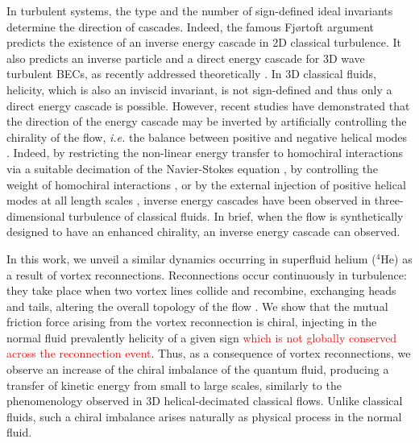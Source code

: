 \documentclass[%
 reprint,
 amsmath,amssymb,
 aps,
 prl,
]{revtex4-2}
\def\red#1{\textcolor{red}{#1}}
\begin{document}
{In turbulent systems, the type and the number of sign-defined ideal invariants determine the direction of cascades. Indeed, the famous 
Fjørtoft argument \cite{fjortoft1953changes} predicts 
the existence of an inverse energy cascade
in 2D classical turbulence. 
It also predicts an inverse particle and a direct energy cascade 
for 3D wave turbulent BECs, as recently addressed theoretically \cite{Zhu_DirectInverseCascades_2023}. In 3D classical fluids, helicity, which is also an inviscid invariant, is not sign-defined and thus only a direct energy cascade is possible. However, recent studies have demonstrated that the direction of the energy 
cascade may be inverted by artificially controlling the chirality of the 
flow, \textit{i.e.} the balance between positive and negative helical 
modes \cite{moffatt1969}.
Indeed, by restricting the non-linear energy transfer to homochiral 
interactions via a suitable decimation of the Navier-Stokes equation 
\cite{biferaleInverseEnergyCascade2012a,biferale-etal-2013}, by
controlling the weight of homochiral interactions \cite{sahoo-etal-2017},
or by the external injection 
of positive helical modes at all length scales 
\cite{plunianInverseCascadeEnergy2020a}, inverse energy cascades 
have been observed in three-dimensional turbulence of classical fluids. 
In brief, when the flow is synthetically designed to have an 
enhanced chirality, an inverse energy cascade can observed.


In this work, we unveil a similar dynamics occurring in superfluid helium
($^4$He) as a result of vortex reconnections.  
Reconnections occur continuously in turbulence: they take place when
two vortex lines collide and recombine, exchanging heads and tails, 
altering the overall topology of the flow
\cite{koplik-levine-1993,bewley-etal-2008,rorai-etal-2016,serafini-etal-2017,galantucci-baggaley-parker-barenghi-2019,villoisUniversalNonuniversalAspects2017,villois2020irreversible}. 
We show that the mutual friction force arising from the  
vortex reconnection is chiral, injecting in the normal fluid prevalently 
helicity of a given sign \red{which is not globally conserved across the reconnection event}. Thus, as a consequence of vortex reconnections,
we observe an increase of the chiral imbalance of the quantum fluid, producing a transfer of kinetic energy from small to large scales, similarly to the phenomenology observed in 3D helical-decimated classical flows. 
 Unlike classical fluids, such a chiral imbalance arises naturally as physical process in the normal fluid.%

}
\end{document}
